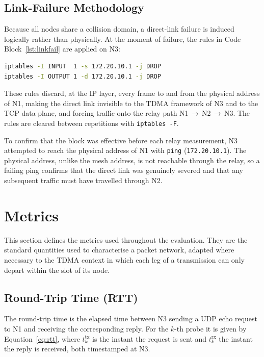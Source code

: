 \subsection{Link-Failure Methodology}
\label{subsec:linkfail}

Because all nodes share a collision domain, a direct-link failure is induced
logically rather than physically. At the moment of failure, the rules in
Code Block~\ref{lst:linkfail} are applied on N3:

\begin{lstlisting}[language=bash,float=ht,caption={Inducing a logical direct-link failure at node N3 via iptables},label=lst:linkfail]
iptables -I INPUT  1 -s 172.20.10.1 -j DROP
iptables -I OUTPUT 1 -d 172.20.10.1 -j DROP
\end{lstlisting}

These rules discard, at the IP layer, every frame to and from the physical
address of N1, making the direct link invisible to the TDMA framework of N3 and to the
TCP data plane, and forcing traffic onto the relay path
N1\,$\to$\,N2\,$\to$\,N3. The rules are cleared between repetitions with
\texttt{iptables -F}.

To confirm that the block was effective before each relay measurement, N3
attempted to reach the physical address of N1 with \texttt{ping}
(\texttt{172.20.10.1}). The physical address, unlike the mesh address, is not
reachable through the relay, so a failing ping confirms that the direct link was
genuinely severed and that any subsequent traffic must have travelled through
N2.


\section{Metrics}
\label{sec:metrics}

This section defines the metrics used throughout the evaluation. They are the
standard quantities used to characterise a packet network, adapted where
necessary to the TDMA context in which each leg of a transmission can only
depart within the slot of its node.

\subsection{Round-Trip Time (RTT)}
\label{subsec:m-rtt}

The round-trip time is the elapsed time between N3 sending a UDP echo request to
N1 and receiving the corresponding reply. For the $k$-th probe it is given by
Equation~\ref{eq:rtt}, where $t^{\mathrm{tx}}_k$ is the instant the request is
sent and $t^{\mathrm{rx}}_k$ the instant the reply is received, both timestamped
at N3.

